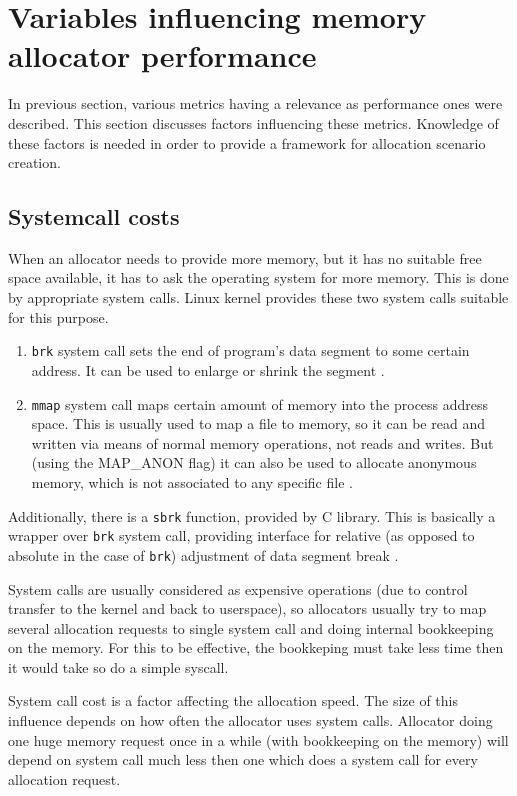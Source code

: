 \section{Variables influencing memory allocator performance}
\label{variables}

In previous section, various metrics having a relevance as performance ones were described. This section discusses factors influencing these metrics. Knowledge of these factors is needed in order to provide a framework for allocation scenario creation.

\subsection{Systemcall costs}

When an allocator needs to provide more memory, but it has no suitable free space available, it has to ask the operating system for more memory. This is done by appropriate system calls. Linux kernel provides these two system calls suitable for this purpose.

\begin{enumerate}
\item {\tt brk} system call sets the end of program's data segment to some certain address. It can be used to enlarge or shrink the segment \cite{posix, sbrk-manpage}.
\item {\tt mmap} system call maps certain amount of memory into the process address space. This is usually used to map a file to memory, so it can be read and written via means of normal memory operations, not reads and writes. But (using the MAP\_ANON flag) it can also be used to allocate anonymous memory, which is not associated to any specific file \cite{posix, mmap-manpage}.
\end{enumerate}

Additionally, there is a {\tt sbrk} function, provided by C library. This is basically a wrapper over {\tt brk} system call, providing interface for relative (as opposed to absolute in the case of {\tt brk}) adjustment of data segment break \cite{sbrk-manpage}.

System calls are usually considered as expensive operations (due to control transfer to the kernel and back to userspace), so allocators usually try to map several allocation requests to single system call and doing internal bookkeeping on the memory. For this to be effective, the bookkeping must take less time then it would take so do a simple syscall.

System call cost is a factor affecting the allocation speed. The size of this influence depends on how often the allocator uses system calls. Allocator doing one huge memory request once in a while (with bookkeeping on the memory) will depend on system call much less then one which does a system call for every allocation request.

